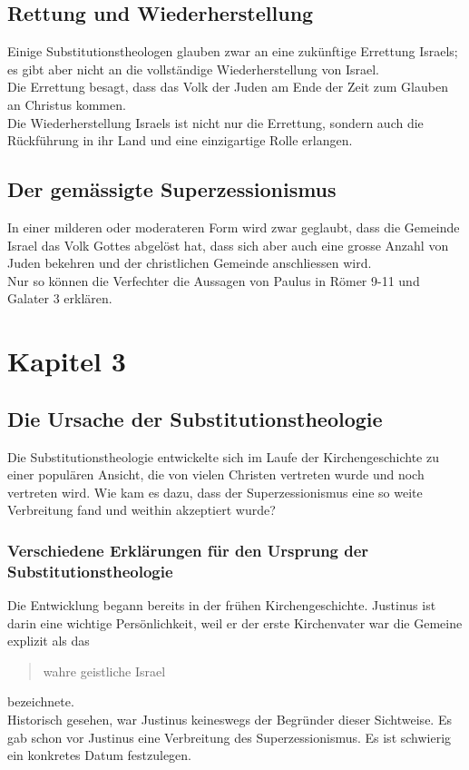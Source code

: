 \documentclass{../../inc/mybib}
\newcommand{\st}{Substitutionstheolog}
\newcommand{\sz}{Superzessionismus}
\begin{document}
    \subsection{Rettung und Wiederherstellung}
    Einige \st en glauben zwar an eine zukünftige Errettung Israels; es gibt aber nicht an die vollständige Wiederherstellung von Israel.\\
    Die Errettung besagt, dass das Volk der Juden am Ende der Zeit zum Glauben an Christus kommen.\\
    Die Wiederherstellung Israels ist nicht nur die Errettung, sondern auch die Rückführung in ihr Land und eine einzigartige Rolle erlangen.

    \subsection{Der gemässigte \sz}
    In einer milderen oder moderateren Form wird zwar geglaubt, dass die Gemeinde Israel das Volk Gottes abgelöst hat, dass sich aber auch eine grosse Anzahl von Juden bekehren und der christlichen Gemeinde anschliessen wird.\\
    Nur so können die Verfechter die Aussagen von Paulus in Römer 9-11 und Galater 3 erklären.
    \section{Kapitel 3}
    \subsection{Die Ursache der \st ie}
    Die \st ie entwickelte sich im Laufe der Kirchengeschichte zu einer populären Ansicht, die von vielen Christen vertreten wurde und noch vertreten wird. Wie kam es dazu, dass der \sz{} eine so weite Verbreitung fand und weithin akzeptiert wurde?
    \subsubsection{Verschiedene Erklärungen für den Ursprung der \st ie}
    Die Entwicklung begann bereits in der frühen Kirchengeschichte. Justinus ist darin eine wichtige Persönlichkeit, weil er der erste Kirchenvater war die Gemeine explizit als das \blockquote{wahre geistliche Israel} bezeichnete.\\
    Historisch gesehen, war Justinus keineswegs der Begründer dieser Sichtweise. Es gab schon vor Justinus eine Verbreitung des \sz. Es ist schwierig ein konkretes Datum festzulegen.
\end{document}
